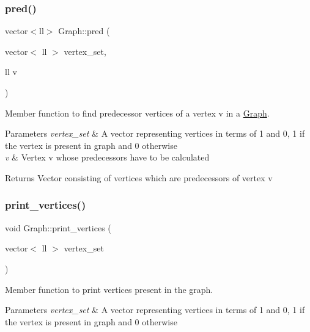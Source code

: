 \subsubsection{\texorpdfstring{pred()}{pred()}}
{\footnotesize\ttfamily vector$<$ll$>$ Graph\+::pred (\begin{DoxyParamCaption}\item[{vector$<$ ll $>$}]{vertex\+\_\+set,  }\item[{ll}]{v }\end{DoxyParamCaption})\hspace{0.3cm}{\ttfamily [inline]}}



Member function to find predecessor vertices of a vertex v in a \hyperlink{classGraph}{Graph}. 


\begin{DoxyParams}{Parameters}
{\em vertex\+\_\+set} & A vector representing vertices in terms of 1 and 0, 1 if the vertex is present in graph and 0 otherwise \\
\hline
{\em v} & Vertex v whose predecessors have to be calculated \\
\hline
\end{DoxyParams}
\begin{DoxyReturn}{Returns}
Vector consisting of vertices which are predecessors of vertex v 
\end{DoxyReturn}
\mbox{\label{classGraph_a2499f1d9980b0f630896d73e714e6603}} 
\subsubsection{\texorpdfstring{print\+\_\+vertices()}{print\_vertices()}}
{\footnotesize\ttfamily void Graph\+::print\+\_\+vertices (\begin{DoxyParamCaption}\item[{vector$<$ ll $>$}]{vertex\+\_\+set }\end{DoxyParamCaption})\hspace{0.3cm}{\ttfamily [inline]}}



Member function to print vertices present in the graph. 


\begin{DoxyParams}{Parameters}
{\em vertex\+\_\+set} & A vector representing vertices in terms of 1 and 0, 1 if the vertex is present in graph and 0 otherwise \\
\hline
\end{DoxyParams}
\mbox{\label{classGraph_ad0fce42e87adc80b81a11baa1331edb9}} 
